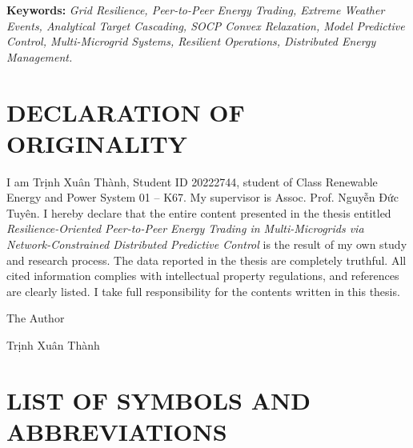 \documentclass{thesis_1side}
\begin{document}
\vspace{12pt}
\noindent\textbf{Keywords:} \textit{Grid Resilience, Peer-to-Peer Energy Trading, Extreme Weather Events, Analytical Target Cascading, SOCP Convex Relaxation, Model Predictive Control, Multi-Microgrid Systems, Resilient Operations, Distributed Energy Management.}

\thispagestyle{empty}
    \clearpage

\section*{DECLARATION OF ORIGINALITY}
    \thispagestyle{empty}

I am Trịnh Xuân Thành, Student ID 20222744, student of Class Renewable Energy and Power System 01 -- K67. My supervisor is Assoc. Prof. Nguyễn Đức Tuyên. I hereby declare that the entire content presented in the thesis entitled \textit{Resilience-Oriented Peer-to-Peer Energy Trading in Multi-Microgrids via Network-Constrained Distributed Predictive Control} is the result of my own study and research process. The data reported in the thesis are completely truthful. All cited information complies with intellectual property regulations, and references are clearly listed. I take full responsibility for the contents written in this thesis.

\vspace{6pt}
    \hspace{9.5cm} The Author

\vspace{2cm}
    \hspace{9.0cm} Trịnh Xuân Thành

\thispagestyle{empty}
    \clearpage
        \thispagestyle{empty}

\tableofcontents
    \thispagestyle{empty}
        \newpage
            \thispagestyle{empty}

\section*{LIST OF SYMBOLS AND ABBREVIATIONS}
\end{document}

